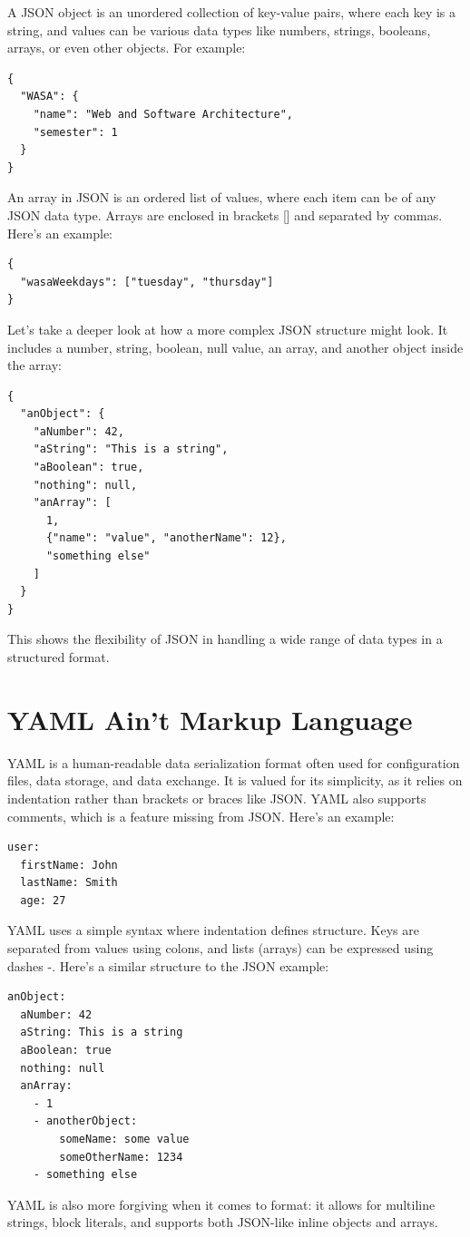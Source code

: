A JSON object is an unordered collection of key-value pairs, where each key is a string, and values can be various data types like numbers, strings, booleans, arrays, or even other objects. For example:
\begin{lstlisting}
{
  "WASA": {
    "name": "Web and Software Architecture",
    "semester": 1
  }
}
\end{lstlisting}
An array in JSON is an ordered list of values, where each item can be of any JSON data type. Arrays are enclosed in brackets [] and separated by commas. Here's an example:
\begin{lstlisting}
{
  "wasaWeekdays": ["tuesday", "thursday"]
}
\end{lstlisting}
Let’s take a deeper look at how a more complex JSON structure might look. It includes a number, string, boolean, null value, an array, and another object inside the array:
\begin{lstlisting}
{
  "anObject": {
    "aNumber": 42,
    "aString": "This is a string",
    "aBoolean": true,
    "nothing": null,
    "anArray": [
      1,
      {"name": "value", "anotherName": 12},
      "something else"
    ]
  }
}
\end{lstlisting}
This shows the flexibility of JSON in handling a wide range of data types in a structured format.

\section{YAML Ain’t Markup Language}
YAML is a human-readable data serialization format often used for configuration files, data storage, and data exchange. It is valued for its simplicity, as it relies on indentation rather than brackets or braces like JSON. YAML also supports comments, which is a feature missing from JSON. Here's an example:
\begin{lstlisting}
user:
  firstName: John
  lastName: Smith
  age: 27
\end{lstlisting}
YAML uses a simple syntax where indentation defines structure. Keys are separated from values using colons, and lists (arrays) can be expressed using dashes -. Here's a similar structure to the JSON example:
\begin{lstlisting}
anObject:
  aNumber: 42
  aString: This is a string
  aBoolean: true
  nothing: null
  anArray:
    - 1
    - anotherObject:
        someName: some value
        someOtherName: 1234
    - something else
\end{lstlisting}
YAML is also more forgiving when it comes to format: it allows for multiline strings, block literals, and supports both JSON-like inline objects and arrays.

